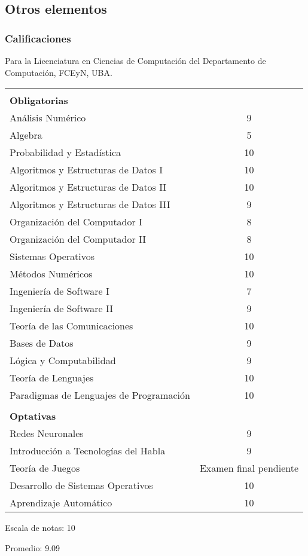 \documentclass[a4paper,10pt]{article}
\begin{document}
\subsection{Otros elementos}

\subsubsection{Calificaciones}

Para la Licenciatura en Ciencias de Computación del Departamento de
Computación, FCEyN, UBA.

\begin{tabular}{ l c }
&\\

\textbf{Obligatorias} \smallskip  & \\ 
Análisis Numérico & 9\\
Algebra & 5\\
Probabilidad y Estadística & 10\\
Algoritmos y Estructuras de Datos I & 10\\
Algoritmos y Estructuras de Datos II & 10\\
Algoritmos y Estructuras de Datos III & 9\\
Organización del Computador I & 8\\
Organización del Computador II & 8\\
Sistemas Operativos & 10\\
Métodos Numéricos & 10\\
Ingeniería de Software I & 7\\
Ingeniería de Software II & 9\\
Teoría de las Comunicaciones & 10\\
Bases de Datos & 9\\
Lógica y Computabilidad & 9\\
Teoría de Lenguajes & 10\\
Paradigmas de Lenguajes de Programación & 10\\
&\\

\textbf{Optativas} \smallskip & \\
Redes Neuronales & 9\\
Introducción a Tecnologías del Habla & 9\\
Teoría de Juegos & Examen final pendiente\\
Desarrollo de Sistemas Operativos & 10\\
Aprendizaje Automático & 10\\
\end{tabular}

\bigskip

Escala de notas: 10

Promedio: 9.09
\end{document}
